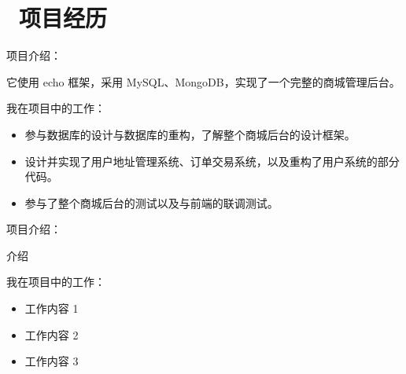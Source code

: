 \documentclass{resume}
\begin{document}
\section{\faUsers\ 项目经历} \vspace{1mm}
\faLink {}

\vspace{1mm} \par
\noindent
项目介绍：

\vspace{1mm}\par
\setlength{\parindent}{2ex}
它使用 echo 框架，采用 MySQL、MongoDB，实现了一个完整的商城管理后台。

\vspace{1mm}\par
\noindent
我在项目中的工作：

\begin{itemize}[parsep=1ex]
  \item 参与数据库的设计与数据库的重构，了解整个商城后台的设计框架。
  \item 设计并实现了用户地址管理系统、订单交易系统，以及重构了用户系统的部分代码。
  \item 参与了整个商城后台的测试以及与前端的联调测试。
\end{itemize} \vspace{1mm}


\vspace{1mm}\par
\noindent
项目介绍：

\vspace{1mm}\par
\setlength{\parindent}{2ex}
介绍

\vspace{1mm}\par
\noindent
我在项目中的工作：

\begin{itemize}[parsep=1ex]
  \item 工作内容 1
  \item 工作内容 2
  \item 工作内容 3
\end{itemize}

\end{document}
